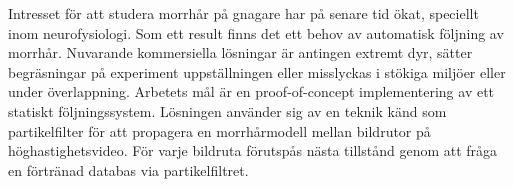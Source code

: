 
Intresset för att studera morrhår på gnagare har på senare tid ökat, speciellt inom neurofysiologi.
Som ett result finns det ett behov av automatisk följning av morrhår.
Nuvarande kommersiella lösningar är antingen extremt dyr, sätter begräsningar på experiment uppställningen
eller misslyckas i stökiga miljöer eller under överlappning.
Arbetets mål är en proof-of-concept implementering av ett statiskt följningssystem. Lösningen använder sig av 
en teknik känd som partikelfilter för att propagera en morrhårmodell mellan bildrutor på höghastighetsvideo.
För varje bildruta förutspås nästa tillstånd genom att fråga en förtränad databas via partikelfiltret.


